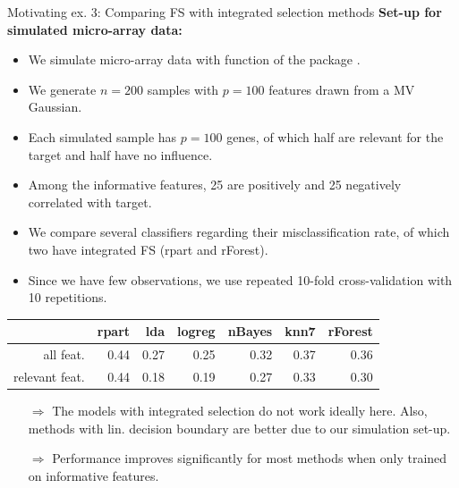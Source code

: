 \documentclass[11pt,compress,t,notes=noshow, xcolor=table]{beamer}
\begin{document}
  \begin{vbframe}{Motivating ex. 3: Comparing FS with integrated selection methods}
\textbf{Set-up for simulated micro-array data:}
\vspace{0.5cm}
  \begin{itemize}
  \setlength{\itemsep}{1.2em}
  \item We simulate micro-array data with function  of the package .
  \item We generate $n=200$ samples with $p=100$ features drawn from a MV Gaussian.
  \item Each simulated sample has $p=100$ genes, of which half are relevant for the target and half have no influence.
  \item Among the informative features, 25 are positively and 25 negatively correlated with target.
  \end{itemize}

  \framebreak

  \begin{itemize}
  \setlength{\itemsep}{1.1em}
  \item We compare several classifiers regarding their misclassification rate, of which two have integrated FS (rpart and rForest).
  \item Since we have few observations, we use repeated 10-fold cross-validation with 10 repetitions.
  \end{itemize}
  \vspace{0.2cm}
  \begin{table}[ht]
    \begin{center}
      \begin{tabular}{rrrrrrr}
        \hline
        & rpart & lda & logreg & nBayes & knn7  & rForest \\
        \hline
        all feat. & 0.44 & 0.27 & 0.25 & 0.32 & 0.37 & 0.36 \\
        relevant feat. & 0.44 & 0.18 & 0.19 & 0.27 & 0.33 & 0.30 \\
        \hline
      \end{tabular}
    \end{center}
  \end{table}
\vspace{0.1cm}
\begin{itemize}
\setlength{\itemsep}{1.0em}
    \item[$\Rightarrow$] The models with integrated selection do not work ideally here. Also, methods with lin. decision boundary are better due to our simulation set-up.
    \item[$\Rightarrow$]   Performance improves significantly for most methods when only trained on informative features.
\end{itemize}

\end{vbframe}

  \endlecture
\end{document}
